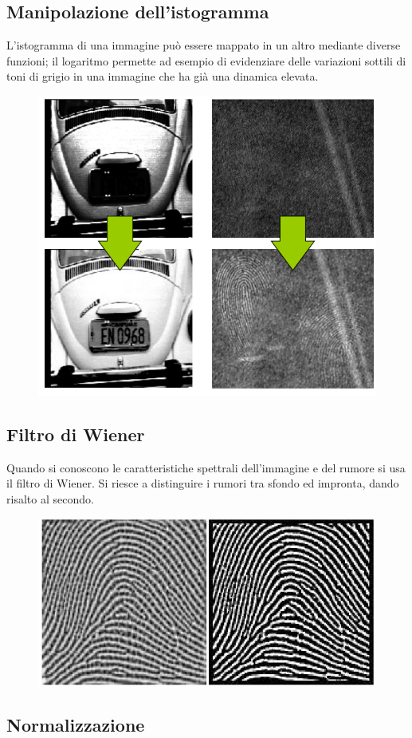 \documentclass{report}
\begin{document}
\subsection{Manipolazione dell'istogramma}

L’istogramma di una
immagine può essere
mappato in un altro
mediante diverse
funzioni; il logaritmo permette
ad esempio di
evidenziare delle
variazioni sottili di toni
di grigio in una
immagine che ha già
una dinamica elevata.

\begin{figure}[ht]
    \centering
    \includegraphics[width=0.5\linewidth]{images/man-isto.png}
\end{figure}

\newpage
\subsection{Filtro di Wiener}

Quando si conoscono le caratteristiche spettrali
dell’immagine e del rumore si usa il filtro di
Wiener. Si riesce a distinguire i rumori tra sfondo ed impronta, dando risalto al secondo.

\begin{figure}[ht]
    \centering
    \includegraphics[width=0.5\linewidth]{images/filtro-we.png}
\end{figure}

\subsection{Normalizzazione}
\end{document}

